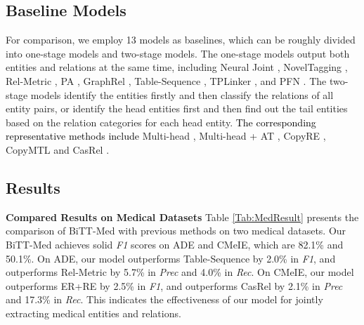\documentclass[conference]{IEEEtran}
\newcommand{\yankun}[1]{\textcolor{black}{#1}}
\begin{document}
\subsection{Baseline Models}
For comparison, we employ 13 models as baselines, which can be roughly divided into one-stage models and two-stage models. The one-stage models output both entities and relations at the same time, including Neural Joint \cite{Li2016Joint}, NovelTagging \cite{Zheng2017Joint}, Rel-Metric \cite{Tran2019Neural}, PA \cite{Dai2019Joint}, GraphRel \cite{Fu2019Graphrel}, Table-Sequence \cite{Wang2020Two}, TPLinker \cite{Wang2020TPLinker}, and PFN \cite{Yan2021A}. The two-stage models identify the entities firstly and then classify the relations of all entity pairs, or identify the head entities first and then find out the tail entities based on the relation categories for each head entity. \yankun{The corresponding representative methods include }Multi-head \cite{Bekoulis2018Joint}, Multi-head + AT \cite{Bekoulis2018Adversarial}, CopyRE \cite{Zeng2018Extracting}, CopyMTL \cite{Zeng2020copymtl} and CasRel \cite{Wei2020CasRel}. 


\subsection{Results}










\textbf{Compared Results on Medical Datasets} Table \ref{Tab:MedResult} presents the comparison of BiTT-Med with previous methods on two medical datasets. Our BiTT-Med achieves solid \emph{F1} scores on ADE and CMeIE, which are 82.1\% and 50.1\%. On ADE, our model outperforms Table-Sequence by 2.0\% in \emph{F1}, and outperforms Rel-Metric by 5.7\% in \emph{Prec} and 4.0\% in \emph{Rec}. On CMeIE, our model outperforms ER+RE by 2.5\% in \emph{F1}, and outperforms CasRel by 2.1\% in \emph{Prec} and 17.3\% in \emph{Rec}. This indicates the effectiveness of our model for jointly extracting medical entities and relations.
\end{document}
